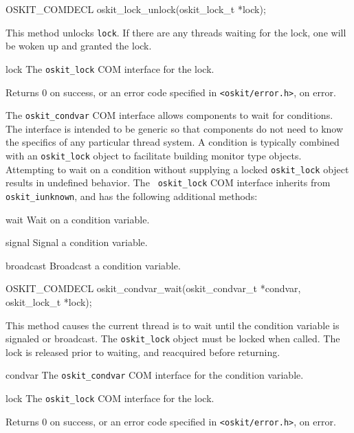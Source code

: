 \begin{apisyn}

	\funcproto OSKIT_COMDECL
	oskit_lock_unlock(oskit_lock_t *lock);
\end{apisyn}
\begin{apidesc}
	This method unlocks {\tt lock}. If there are any threads waiting for
	the lock, one will be woken up and granted the lock.
\end{apidesc}
\begin{apiparm}
	\item[lock]
		The {\tt oskit_lock} COM interface for the lock.
\end{apiparm}
\begin{apiret}
	Returns 0 on success, or an error code specified in
	{\tt <oskit/error.h>}, on error.
\end{apiret}



The {\tt oskit_condvar} COM interface allows components to wait for
conditions. The interface is intended to be generic so that components do
not need to know the specifics of any particular thread system. A condition
is typically combined with an {\tt oskit_lock} object to facilitate building
monitor type objects. Attempting to wait on a condition without supplying a
locked {\tt oskit_lock} object results in undefined behavior. The {\tt
oskit_lock} COM interface inherits from {\tt oskit_iunknown}, and has the
following additional methods:

\begin{icsymlist}
\item[wait]
	Wait on a condition variable.
\item[signal]
	Signal a condition variable.
\item[broadcast]
	Broadcast a condition variable.
\end{icsymlist}

\begin{apisyn}

	\funcproto OSKIT_COMDECL
	oskit_condvar_wait(oskit_condvar_t *condvar, oskit_lock_t *lock);
\end{apisyn}
\begin{apidesc}
	This method causes the current thread is to wait until the
	condition variable is signaled or broadcast. The {\tt oskit_lock}
	object must be locked when called. The lock is released prior to
	waiting, and reacquired before returning.
\end{apidesc}
\begin{apiparm}
	\item[condvar]
		The {\tt oskit_condvar} COM interface for the condition
		variable.
	\item[lock]
		The {\tt oskit_lock} COM interface for the lock.
\end{apiparm}
\begin{apiret}
	Returns 0 on success, or an error code specified in
	{\tt <oskit/error.h>}, on error.
\end{apiret}

